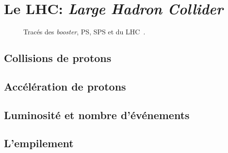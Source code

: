 \section{Le LHC: \emph{Large Hadron Collider}}\label{chapter-LHC-section-LHC}

\cite{LHC_paper}

\begin{wrapfigure}{R}{8.5cm}
\centering

\caption[Tracés des \emph{booster}, PS, SPS et du LHC.]{Tracés des \emph{booster}, PS, SPS et du LHC~\cite{CERN_map}.}
\label{fig-CERN_map}
\end{wrapfigure}

\subsection{Collisions de protons}\label{chapter-LHC-section-LHC-subsec-pp_collisions}

\subsection{Accélération de protons}\label{chapter-LHC-section-LHC-subsec-pp_acceleration}

\subsection{Luminosité et nombre d'événements}\label{chapter-LHC-section-LHC-subsec-lumi}

\subsection{L'empilement}\label{chapter-LHC-section-LHC-subsec-PU}

